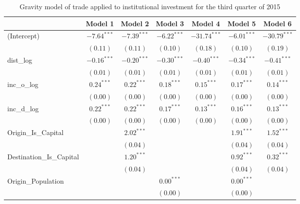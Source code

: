 \begin{table}
	\begin{center}
		\small
		\caption[Gravity Model of Trade for Q3 2015]{Gravity model of trade applied to institutional investment for the third quarter of 2015}
		\begin{tabular}{l c c c c c c }
			\hline
			& Model 1 & Model 2 & Model 3 & Model 4 & Model 5 & Model 6 \\
			\hline
			(Intercept)                  & $-7.64^{***}$ & $-7.39^{***}$ & $-6.22^{***}$ & $-31.74^{***}$ & $-6.01^{***}$ & $-30.79^{***}$ \\
			& $(0.11)$      & $(0.11)$      & $(0.10)$      & $(0.18)$       & $(0.10)$      & $(0.19)$       \\
			dist\_log                    & $-0.16^{***}$ & $-0.20^{***}$ & $-0.30^{***}$ & $-0.40^{***}$  & $-0.34^{***}$ & $-0.41^{***}$  \\
			& $(0.01)$      & $(0.01)$      & $(0.01)$      & $(0.01)$       & $(0.01)$      & $(0.01)$       \\
			inc\_o\_log                  & $0.24^{***}$  & $0.22^{***}$  & $0.18^{***}$  & $0.15^{***}$   & $0.17^{***}$  & $0.14^{***}$   \\
			& $(0.00)$      & $(0.00)$      & $(0.00)$      & $(0.00)$       & $(0.00)$      & $(0.00)$       \\
			inc\_d\_log                  & $0.22^{***}$  & $0.22^{***}$  & $0.17^{***}$  & $0.13^{***}$   & $0.16^{***}$  & $0.13^{***}$   \\
			& $(0.00)$      & $(0.00)$      & $(0.00)$      & $(0.00)$       & $(0.00)$      & $(0.00)$       \\
			Origin\_Is\_Capital          &               & $2.02^{***}$  &               &                & $1.91^{***}$  & $1.52^{***}$   \\
			&               & $(0.04)$      &               &                & $(0.04)$      & $(0.04)$       \\
			Destination\_Is\_Capital     &               & $1.20^{***}$  &               &                & $0.92^{***}$  & $0.32^{***}$   \\
			&               & $(0.04)$      &               &                & $(0.04)$      & $(0.04)$       \\
			Origin\_Population           &               &               & $0.00^{***}$  &                & $0.00^{***}$  &                \\
			&               &               & $(0.00)$      &                & $(0.00)$      &                \\

\end{tabular}
\end{center}
\end{table}
